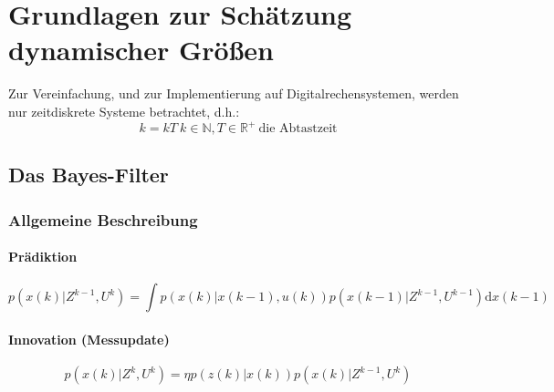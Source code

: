 \chapter{Grundlagen zur Schätzung dynamischer Größen}
Zur Vereinfachung, und zur Implementierung auf Digitalrechensystemen, werden nur zeitdiskrete Systeme betrachtet, d.h.:
\begin{equation*}
    k = kT\ k \in \mathbb{N}, T \in \mathbb{R}^+\ \text{die Abtastzeit}
\end{equation*}

\section{Das Bayes-Filter}
\subsection{Allgemeine Beschreibung}
\subsubsection{Prädiktion}
\begin{equation*}
    p(x(k) | Z^{k-1}, U^k) = \int p(x(k)|x(k-1), u(k)) p(x(k-1)|Z^{k-1}, U^{k-1}) \text{d}x(k-1)
\end{equation*}

\subsubsection{Innovation (Messupdate)}
\begin{equation*}
    p(x(k)|Z^k, U^k) = \eta p(z(k)|x(k)) p(x(k) | Z^{k-1}, U^k)
\end{equation*}
